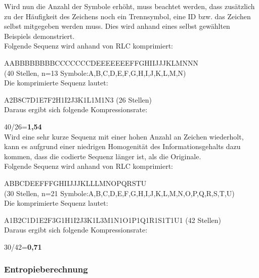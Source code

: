 \documentclass[12pt,german]{article}
\begin{document}
Wird nun die Anzahl der Symbole erhöht, muss beachtet werden, dass zusätzlich zu der Häufigkeit des Zeichens noch ein Trennsymbol, eine ID bzw. das Zeichen selbst mitgegeben werden muss. Dies wird anhand eines selbst gewählten Beispiels demonstriert.\\

Folgende Sequenz wird anhand von RLC komprimiert:

AABBBBBBBBCCCCCCCDEEEEEEEFFGHIIJJJKLMNNN\\ (40 Stellen, n=13 Symbole:A,B,C,D,E,F,G,H,I,J,K,L,M,N)\\

Die komprimierte Sequenz lautet:

A2B8C7D1E7F2H1I2J3K1L1M1N3 (26 Stellen)\\

Daraus ergibt sich folgende Kompressionsrate:

40/26=\textbf{1,54}\\

Wird eine sehr kurze Sequenz mit einer hohen Anzahl an Zeichen wiederholt, kann es aufgrund einer niedrigen Homogenität des Informationsgehalts dazu kommen, dass die codierte Sequenz länger ist, als die Originale.\\


Folgende Sequenz wird anhand von RLC komprimiert:

ABBCDEEFFFGHIIJJJKLLLMNOPQRSTU\\ (30 Stellen, n=21 Symbole:A,B,C,D,E,F,G,H,I,J,K,L,M,N,O,P,Q,R,S,T,U)\\

Die komprimierte Sequenz lautet:

A1B2C1D1E2F3G1H1I2J3K1L3M1N1O1P1Q1R1S1T1U1 (42 Stellen)\\

Daraus ergibt sich folgende Kompressionsrate:

30/42=\textbf{0,71}\\

\subsubsection{Entropieberechnung}
\end{document}
